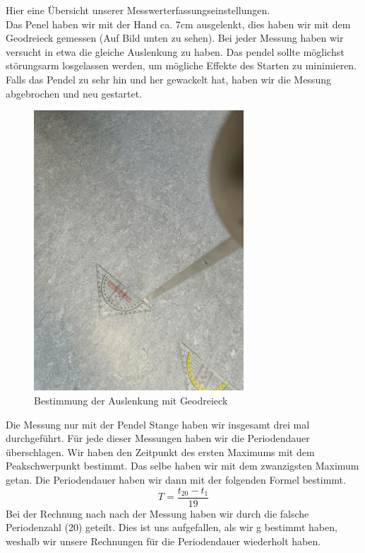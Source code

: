 \documentclass[twoside]{protokoll}
\begin{document}
Hier eine Übersicht unserer Messwerterfassungseinstellungen.\\
Das Penel haben wir mit der Hand ca. 7cm ausgelenkt, dies haben wir mit dem Geodreieck gemessen (Auf Bild unten zu sehen). 
Bei jeder Messung haben wir versucht in etwa die gleiche Auslenkung zu haben. 
Das pendel sollte möglichst störungsarm losgelassen werden, um mögliche Effekte des Starten zu minimieren. 
Falls das Pendel zu sehr hin und her gewackelt hat, haben wir die Messung abgebrochen und neu gestartet.\\
\begin{figure}[H]
    \centering
    \includegraphics[width=0.7\textwidth]{Bilder/geodreieck.pdf}
    \caption{Bestimmung der Auslenkung mit Geodreieck}
    \end{figure}
Die Messung nur mit der Pendel Stange haben wir insgesamt drei mal durchgeführt. 
Für jede dieser Messungen haben wir die Periodendauer überschlagen.
Wir haben den Zeitpunkt des ersten Maximums mit dem Peakschwerpunkt bestimmt. Das selbe haben wir mit dem zwanzigsten Maximum getan. 
Die Periodendauer haben wir dann mit der folgenden Formel bestimmt.
\begin{equation}
T = \frac{t_{20} - t_{1}}{19}
\end{equation}
Bei der Rechnung nach nach der Messung haben wir durch die falsche Periodenzahl (20) geteilt. 
Dies ist uns aufgefallen, als wir g bestimmt haben, weshalb wir unsere Rechnungen für die Periodendauer wiederholt haben.\\
\end{document}

